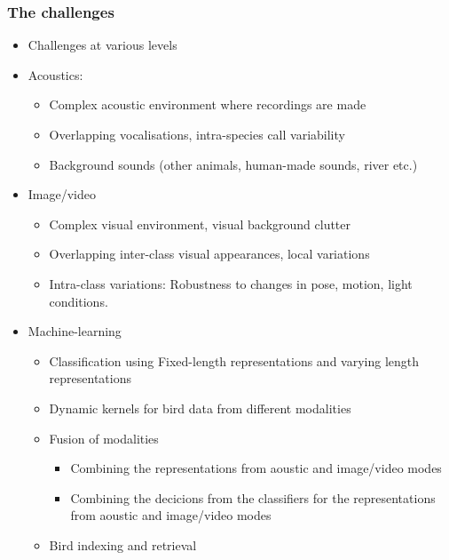 \documentclass[mathserif]{beamer}
\begin{document}
\begin{frame}
\frametitle{The challenges}
\begin{itemize}
\item<2-> Challenges at various levels
\item<3-> Acoustics:
	\begin{itemize}
	\item<4-> Complex acoustic environment where recordings are made
	\item<5-> Overlapping vocalisations, intra-species call variability
	\item<7-> Background sounds (other animals, human-made sounds, river etc.)
	\end{itemize}
\item<8-> Image/video 
	\begin{itemize}
	\item<9-> Complex visual environment, visual background clutter
	\item<10-> Overlapping inter-class visual appearances, local variations  
	\item<11-> Intra-class variations: Robustness to changes in pose, motion, light conditions.
	\end{itemize}
\item<15-> Machine-learning
	\begin{itemize}
	\item<16-> Classification using Fixed-length representations and varying length representations
	\item<17-> Dynamic kernels for bird data from different modalities
	\item<18-> Fusion of modalities
	\begin{itemize}
	    \item<19-> Combining the representations from aoustic and image/video modes
	    \item<20-> Combining the decicions from the classifiers for the representations from aoustic and image/video modes
	\end{itemize}
	\item<21-> Bird indexing and retrieval
	\end{itemize}
\end{itemize}
\end{frame}
\end{document}
